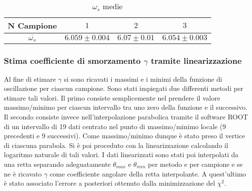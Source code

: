 \documentclass[a4paper,11pt,oneside]{article}
\begin{document}
\begin{table}[h!]
    \centering
    \begin{tabular}{|c|c|c|c|}
        \hline
        \textbf{N Campione} & $1$ & $2$ & $3$\\ \hline
        \textbf{$\overline{\omega_s}$} & $6.059\pm0.004$ & $6.07\pm0.01$ & $6.054\pm0.003$\\ \hline
    \end{tabular}
    \caption{$\omega_s$ medie}
    \label{tab:omega_s_medie}
\end{table}


\subsubsection{Stima coefficiente di smorzamento $\gamma$ tramite linearizzazione}
Al fine di stimare $\gamma$ si sono ricavati i massimi e i minimi della funzione di oscillazione per ciascun campione. Sono stati impiegati due differenti metodi per stimare tali valori. Il primo consiste semplicemente nel prendere il valore massimo/minimo per ciascun intervallo tra uno zero della funzione e il successivo. Il secondo consiste invece nell'interpolazione parabolica tramite il software ROOT di un intervallo di 19 dati centrato nel punto di massimo/minimo locale (9 precedenti e 9 successivi). Come massimo/minimo dunque è stato preso il vertice di ciascuna parabola. Si è poi proceduto con la linearizzazione calcolando il logaritmo naturale di tali valori. I dati linearizzati sono stati poi interpolati da una retta separando adeguatamente $\theta_{max}$ e $\theta_{min}$ per metodo e per campione e se ne è ricavato $\gamma$ come coefficiente angolare della retta interpolante. A quest'ultimo è stato associato l'errore a posteriori ottenuto dalla minimizzazione del $\chi^2$.
\end{document}
